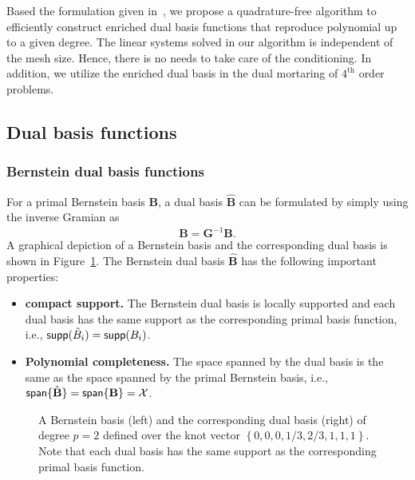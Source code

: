 Based the formulation given in~\cite{oswald2001polynomial}, we propose a quadrature-free algorithm to efficiently construct enriched dual basis functions that reproduce polynomial up to a given degree. The linear systems solved in our algorithm is independent of the mesh size. Hence, there is no needs to take care of the conditioning. In addition, we utilize the enriched dual basis in the dual mortaring of $4^\text{th}$ order problems. \par

\subsection{Dual basis functions}

\subsubsection{Bernstein dual basis functions}
For a primal Bernstein basis $\mathbf{B}$, a dual basis $\hat{\mathbf{B}}$ can be formulated by simply using the inverse Gramian as
\begin{equation}
	\hat{\mathbf{B}} = \mathbf{G}^{-1}\mathbf{B}.\label{eq:global_dual}
\end{equation}
A graphical depiction of a Bernstein basis and the corresponding dual basis is shown in Figure~\ref{fig:bezier_and_its_dual}. The Bernstein dual basis $\hat{\mathbf{B}}$ has the following important properties:
\begin{itemize}
	\item{\textbf{compact support.}} The Bernstein dual basis is locally supported and each dual basis has the same support as the corresponding primal basis function, i.e., $\mathop{\mathsf{supp}}(\hat{B}_i)=\mathop{\mathsf{supp}}({B}_i)$.
	\item{\textbf{Polynomial completeness.}} The space spanned by the dual basis is the same as the space spanned by the primal Bernstein basis, i.e., $\operatorname{\mathsf{span}}\{\hat{\mathbf{B}}\}=\operatorname{\mathsf{span}}\{\mathbf{B}\}=\mathcal{X}$.
\end{itemize}

\begin{figure}
	\center
	\hspace{1cm}
	\caption{A Bernstein basis (left) and the corresponding dual basis (right) of degree $p=2$ defined over the knot vector $\left\{0,0,0,1/3,2/3,1,1,1\right\}$. Note that each dual basis has the same support as the corresponding primal basis function.}
	\label{fig:bezier_and_its_dual}
\end{figure}

